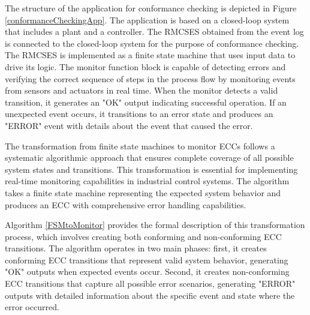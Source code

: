The structure of the application for conformance checking is depicted in Figure \ref{conformanceCheckingApp}. The application is based on a closed-loop system that includes a plant and a controller. The RMCSES obtained from the event log is connected to the closed-loop system for the purpose of conformance checking. The RMCSES is implemented as a finite state machine that uses input data to drive its logic. The monitor function block is capable of detecting errors and verifying the correct sequence of steps in the process flow by monitoring events from sensors and actuators in real time. When the monitor detects a valid transition, it generates an "OK" output indicating successful operation. If an unexpected event occurs, it transitions to an error state and produces an "ERROR" event with details about the event that caused the error.

The transformation from finite state machines to monitor ECCs follows a systematic algorithmic approach that ensures complete coverage of all possible system states and transitions. This transformation is essential for implementing real-time monitoring capabilities in industrial control systems. The algorithm takes a finite state machine representing the expected system behavior and produces an ECC with comprehensive error handling capabilities.

Algorithm \ref{FSMtoMonitor} provides the formal description of this transformation process, which involves creating both conforming and non-conforming ECC transitions. The algorithm operates in two main phases: first, it creates conforming ECC transitions that represent valid system behavior, generating "OK" outputs when expected events occur. Second, it creates non-conforming ECC transitions that capture all possible error scenarios, generating "ERROR" outputs with detailed information about the specific event and state where the error occurred.


